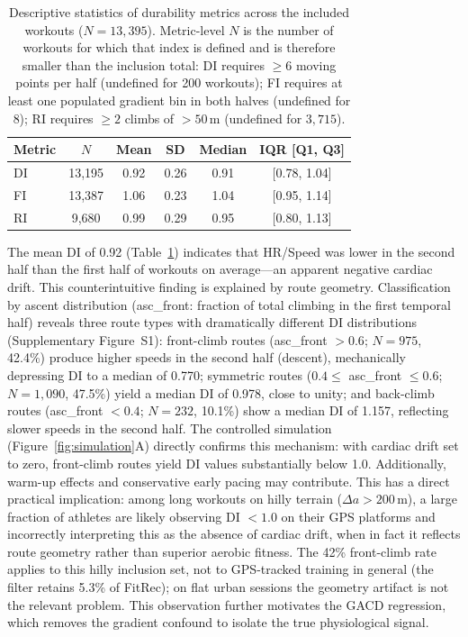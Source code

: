 \documentclass[times, twoside]{zHenriquesLab-StyleBioRxiv}
\begin{document}
\begin{table}[ht]
\centering
\small
\caption{Descriptive statistics of durability metrics across the included workouts ($N = 13{,}395$). Metric-level $N$ is the number of workouts for which that index is defined and is therefore smaller than the inclusion total: DI requires $\geq 6$ moving points per half (undefined for 200 workouts); FI requires at least one populated gradient bin in both halves (undefined for 8); RI requires $\geq 2$ climbs of $>50\,\mathrm{m}$ (undefined for $3{,}715$).}
\label{tab:descriptive}
\begin{tabular}{@{}lccccc@{}}
\toprule
Metric & $N$ & Mean & SD & Median & IQR [Q1, Q3] \\
\midrule
DI & 13{,}195 & 0.92 & 0.26 & 0.91 & [0.78, 1.04] \\
FI & 13{,}387 & 1.06 & 0.23 & 1.04 & [0.95, 1.14] \\
RI & 9{,}680 & 0.99 & 0.29 & 0.95 & [0.80, 1.13] \\
\bottomrule
\end{tabular}
\end{table}

The mean DI of 0.92 (Table~\ref{tab:descriptive}) indicates that HR/Speed was lower in the second half than the first half of workouts on average---an apparent negative cardiac drift. This counterintuitive finding is explained by route geometry. Classification by ascent distribution (asc\_front: fraction of total climbing in the first temporal half) reveals three route types with dramatically different DI distributions (Supplementary Figure~S1): front-climb routes (asc\_front $> 0.6$; $N = 975$, 42.4\%) produce higher speeds in the second half (descent), mechanically depressing DI to a median of 0.770; symmetric routes ($0.4 \leq$ asc\_front $\leq 0.6$; $N = 1{,}090$, 47.5\%) yield a median DI of 0.978, close to unity; and back-climb routes (asc\_front $< 0.4$; $N = 232$, 10.1\%) show a median DI of 1.157, reflecting slower speeds in the second half. The controlled simulation (Figure~\ref{fig:simulation}A) directly confirms this mechanism: with cardiac drift set to zero, front-climb routes yield DI values substantially below 1.0. Additionally, warm-up effects and conservative early pacing may contribute. This has a direct practical implication: among long workouts on hilly terrain ($\Delta a > 200\,\mathrm{m}$), a large fraction of athletes are likely observing DI $< 1.0$ on their GPS platforms and incorrectly interpreting this as the absence of cardiac drift, when in fact it reflects route geometry rather than superior aerobic fitness. The 42\% front-climb rate applies to this hilly inclusion set, not to GPS-tracked training in general (the filter retains 5.3\% of FitRec); on flat urban sessions the geometry artifact is not the relevant problem. This observation further motivates the GACD regression, which removes the gradient confound to isolate the true physiological signal.
\end{document}
